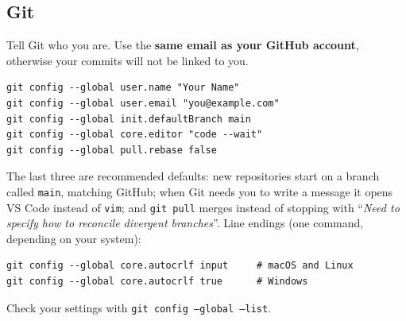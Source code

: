 \documentclass[11pt,a4paper]{article}
\newcommand{\cmd}[1]{\texttt{#1}}
\begin{document}
\subsection{Git}\label{sec:gitconfig}
Tell Git who you are. Use the \textbf{same email as your GitHub account}, otherwise
your commits will not be linked to you.
\begin{lstlisting}
git config --global user.name "Your Name"
git config --global user.email "you@example.com"
git config --global init.defaultBranch main
git config --global core.editor "code --wait"
git config --global pull.rebase false
\end{lstlisting}
The last three are recommended defaults: new repositories start on a branch called
\cmd{main}, matching GitHub; when Git needs you to write a message it opens VS Code
instead of \cmd{vim}; and \cmd{git pull} merges instead of stopping with
``\emph{Need to specify how to reconcile divergent branches}''.
Line endings (one command, depending on your system):
\begin{lstlisting}
git config --global core.autocrlf input     # macOS and Linux
git config --global core.autocrlf true      # Windows
\end{lstlisting}
Check your settings with \cmd{git config --global --list}.
\end{document}
